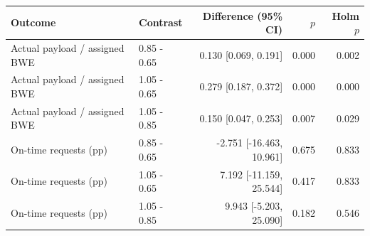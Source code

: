 \begin{tabular}{llrrr}
\toprule
Outcome & Contrast & Difference (95\% CI) & $p$ & Holm $p$ \\
\midrule
Actual payload / assigned BWE & 0.85 - 0.65 & 0.130 [0.069, 0.191] & 0.000 & 0.002 \\
Actual payload / assigned BWE & 1.05 - 0.65 & 0.279 [0.187, 0.372] & 0.000 & 0.000 \\
Actual payload / assigned BWE & 1.05 - 0.85 & 0.150 [0.047, 0.253] & 0.007 & 0.029 \\
On-time requests (pp) & 0.85 - 0.65 & -2.751 [-16.463, 10.961] & 0.675 & 0.833 \\
On-time requests (pp) & 1.05 - 0.65 & 7.192 [-11.159, 25.544] & 0.417 & 0.833 \\
On-time requests (pp) & 1.05 - 0.85 & 9.943 [-5.203, 25.090] & 0.182 & 0.546 \\
\bottomrule
\end{tabular}
